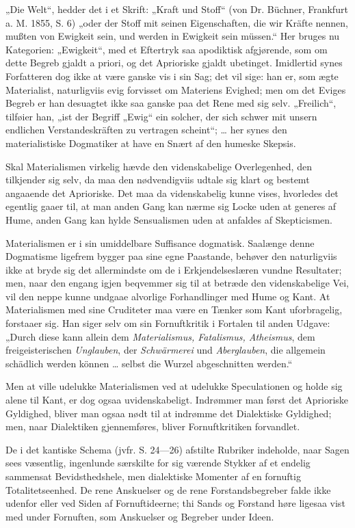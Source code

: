 \documentclass[12pt]{book}
\newcommand{\opage}[1]{\marginnote{\footnotesize\textit{[#1]}}}
\begin{document}
„Die Welt“, hedder det i et Skrift: „Kraft und Stoff“ (von Dr. Büchner, Frankfurt a. M. 1855,
S. 6) „oder der Stoff mit seinen Eigenschaften, die wir Kräfte nennen, mußten von Ewigkeit sein, und
werden in Ewigkeit sein müssen.“ Her bruges nu Kategorien: „Ewigkeit“, med et Eftertryk saa
apodiktisk afgjørende, som om dette Begreb gjaldt a priori, og det Aprioriske gjaldt ubetinget.
Imidlertid synes Forfatteren dog ikke at være ganske vis i sin Sag; det vil
\opage{179} sige: han er, som ægte Materialist, naturligviis evig forvisset om Materiens Evighed; men om det
Eviges Begreb er han desuagtet ikke saa ganske paa det Rene med sig selv. „Freilich“, tilføier han,
„ist der Begriff „Ewig“ ein solcher, der sich schwer mit unsern endlichen Verstandeskräften zu
vertragen scheint“; \ldots{} her synes den materialistiske Dogmatiker at have en Snært af den humeske
Skepsis.

Skal Materialismen virkelig hævde den videnskabelige Overlegenhed, den tilkjender sig selv, da maa
den nødvendigviis udtale sig klart og bestemt angaaende det Aprioriske. Det maa da videnskabelig
kunne vises, hvorledes det egentlig gaaer til, at man anden Gang kan nærme sig Locke uden at generes
af Hume, anden Gang kan hylde Sensualismen uden at anfaldes af Skepticismen.

Materialismen er i sin umiddelbare Suffisance dogmatisk. Saalænge denne Dogmatisme ligefrem bygger
paa sine egne Paastande, behøver den naturligviis ikke at bryde sig det allermindste om de i
Erkjendelseslæren vundne Resultater; men, naar den engang igjen beqvemmer sig til at betræde den
videnskabelige Vei, vil den neppe kunne undgaae alvorlige Forhandlinger med Hume og Kant. At
Materialismen med sine Cruditeter maa være en Tænker som Kant uforbragelig, forstaaer sig. Han siger
selv om sin Fornuftkritik i Fortalen til anden Udgave: „Durch diese kann allein dem
\emph{Materialismus, Fatalismus, Atheismus}, dem freigeisterischen \emph{Unglauben}, der
\emph{Schwärmerei} und \emph{Aberglauben}, die allgemein schädlich werden können \ldots{} selbst die
Wurzel abgeschnitten werden.“

Men at ville udelukke Materialismen ved at udelukke Speculationen og holde sig alene til Kant, er dog
ogsaa uvidenskabeligt. Indrømmer man først det Aprioriske Gyldighed, bliver man ogsaa nødt til at
indrømme det Dialektiske Gyldighed; men, naar Dialektiken gjennemføres, bliver Fornuftkritiken
forvandlet.

\opage{180} De i det kantiske Schema (jvfr. S. 24---26) afstilte Rubriker indeholde, naar Sagen sees væsentlig,
ingenlunde særskilte for sig værende Stykker af et endelig sammensat Bevidsthedshele, men dialektiske
Momenter af en fornuftig Totalitetseenhed. De rene Anskuelser og de rene Forstandsbegreber falde ikke
udenfor eller ved Siden af Fornuftideerne; thi Sands og Forstand høre ligesaa vist med under
Fornuften, som Anskuelser og Begreber under Ideen.
\end{document}
